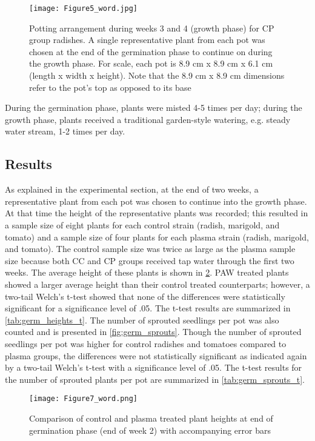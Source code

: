 \begin{figure}[htbp]
  \centering
  \texttt{[image: Figure5\_word.jpg]}
  \caption{Potting arrangement during weeks 3 and 4 (growth phase) for CP group radishes.  A single representative plant from each pot was chosen at the end of the germination phase to continue on during the growth phase. For scale, each pot is 8.9 cm x 8.9 cm x 6.1 cm (length x width x height). Note that the 8.9 cm x 8.9 cm dimensions refer to the pot’s top as opposed to its base}
  \label{fig:cp_growth}
\end{figure}

During the germination phase, plants were misted 4-5 times per day; during the growth phase, plants received a traditional garden-style watering, e.g. steady water stream, 1-2 times per day.

\subsection{Results}

As explained in the experimental section, at the end of two weeks, a representative plant from each pot was chosen to continue into the growth phase.  At that time the height of the representative plants was recorded; this resulted in a sample size of eight plants for each control strain (radish, marigold, and tomato) and a sample size of four plants for each plasma strain (radish, marigold, and tomato).  The control sample size was twice as large as the plasma sample size because both CC and CP groups received tap water through the first two weeks.  The average height of these plants is shown in \cref{fig:germ_heights}. PAW treated plants showed a larger average height than their control treated counterparts; however, a two-tail Welch's t-test showed that none of the differences were statistically significant for a significance level of .05.  The t-test results are summarized in \cref{tab:germ_heights_t}.    The number of sprouted seedlings per pot was also counted and is presented in \cref{fig:germ_sprouts}.  Though the number of sprouted seedlings per pot was higher for control radishes and tomatoes compared to plasma groups, the differences were not statistically significant as indicated again by a two-tail Welch's t-test with a significance level of .05.  The t-test results for the number of sprouted plants per pot are summarized in \cref{tab:germ_sprouts_t}.

\begin{figure}[htbp]
  \centering
  \texttt{[image: Figure7\_word.png]}
  \caption{Comparison of control and plasma treated plant heights at end of germination phase (end of week 2) with accompanying error bars}
  \label{fig:germ_heights}
\end{figure}


